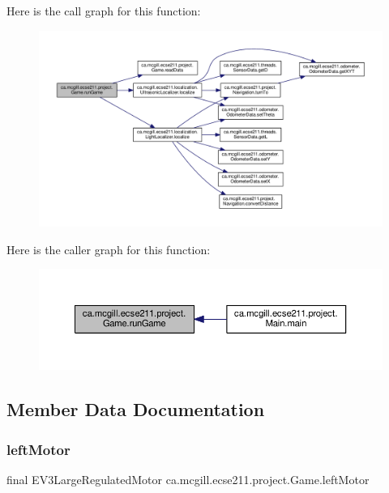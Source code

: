 Here is the call graph for this function\+:
\nopagebreak
\begin{figure}[H]
\begin{center}
\leavevmode
\includegraphics[width=350pt]{classca_1_1mcgill_1_1ecse211_1_1project_1_1_game_a790740a4ed299c9b985401ea8c4d5010_cgraph}
\end{center}
\end{figure}
Here is the caller graph for this function\+:
\nopagebreak
\begin{figure}[H]
\begin{center}
\leavevmode
\includegraphics[width=350pt]{classca_1_1mcgill_1_1ecse211_1_1project_1_1_game_a790740a4ed299c9b985401ea8c4d5010_icgraph}
\end{center}
\end{figure}


\subsection{Member Data Documentation}
\mbox{\label{classca_1_1mcgill_1_1ecse211_1_1project_1_1_game_a40f6d5a8c70b88bf89b2171a02d2813f}} 
\subsubsection{\texorpdfstring{left\+Motor}{leftMotor}}
{\footnotesize\ttfamily final E\+V3\+Large\+Regulated\+Motor ca.\+mcgill.\+ecse211.\+project.\+Game.\+left\+Motor\hspace{0.3cm}{\ttfamily [static]}}

